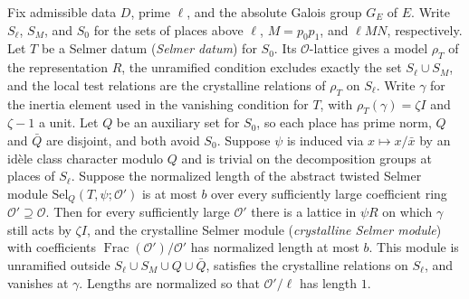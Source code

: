 \begin{lemma}
\label{lem:c-selmer-base-change}
\emitthmsource
Fix admissible data $D$, prime $\ell$, and the absolute Galois group $G_E$ of $E$. Write $S_\ell$, $S_M$, and $S_0$ for the sets of places above $\ell$, $M=p_0p_1$, and $\ell MN$, respectively.
Let $T$ be a Selmer datum (\emph{Selmer datum}) for $S_0$. Its $\mathcal O$-lattice gives a model $\rho_T$ of the representation $R$, the unramified condition excludes exactly the set $S_\ell\cup S_M$, and the local test relations are the crystalline relations of $\rho_T$ on $S_\ell$. Write $\gamma$ for the inertia element used in the vanishing condition for $T$, with $\rho_T(\gamma)=\zeta I$ and $\zeta-1$ a unit.
Let $Q$ be an auxiliary set for $S_0$, so each place has prime norm, $Q$ and $\bar Q$ are disjoint, and both avoid $S_0$.
Suppose $\psi$ is induced via $x\mapsto x/\bar x$ by an idèle class character modulo $Q$ and is trivial on the decomposition groups at places of $S_\ell$. Suppose the normalized length of the abstract twisted Selmer module $\mathrm{Sel}_Q(T,\psi;\mathcal O')$ is at most $b$ over every sufficiently large coefficient ring $\mathcal O'\supseteq\mathcal O$. Then for every sufficiently large $\mathcal O'$ there is a lattice in $\psi R$ on which $\gamma$ still acts by $\zeta I$, and the crystalline Selmer module (\emph{crystalline Selmer module}) with coefficients $\operatorname{Frac}(\mathcal O')/\mathcal O'$ has normalized length at most $b$. This module is unramified outside $S_\ell\cup S_M\cup Q\cup\bar Q$, satisfies the crystalline relations on $S_\ell$, and vanishes at $\gamma$. Lengths are normalized so that $\mathcal O'/\ell$ has length $1$.
\end{lemma}
